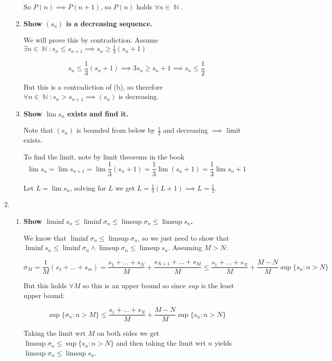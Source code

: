 \documentclass[10pt,a4paper]{article}
\DeclareMathOperator*{\N}{\mathbb{N}}
\begin{document}
\begin{enumerate}
\begin{enumerate}
            So $P(n) \implies P(n+1)$, so $P(n)$ holds $\forall n \in \N$.
        
        \item \textbf{Show $( s_n)$ is a decreasing sequence.}

            We will prove this by contradiction. Assume $\exists n \in \N: s_n \leq s_{n+1} \implies s_n \geq \frac{1}{3}(s_n + 1)$

            $$s_n \leq \frac{1}{3} (s_n + 1) \implies 3s_n \geq s_n+1 \implies s_n \leq \frac{1}{2}$$

            But this is a contradiction of (b), so therefore $\forall n \in \N : s_n > s_{n+1} \implies (s_n)$ is decreasing.

        \item \textbf{Show $\lim s_n$ exists and find it.}

            Note that $(s_n)$ is bounded from below by $\frac{1}{2}$ and decreasing $\implies$ limit exists.

            To find the limit, note by limit theorems in the book
            $$\lim s_n = \lim s_{n+1} = \lim \frac{1}{3}(s_n + 1) = \frac{1}{3} \lim (s_n +1)  = \frac{1}{3} \lim s_n +1 $$

            Let $L = \lim s_n$, solving for $L$ we get $L = \frac{1}{3}(L+1) \implies L = \frac{1}{2}$.


    \end{enumerate}
    
    \item \begin{enumerate}
        \item \textbf{Show $\liminf s_n \leq \liminf \sigma_n \leq \limsup \sigma_n \leq \limsup s_n$.}

        We know that $\liminf \sigma_n \leq \limsup \sigma_n$, so we just need to show that $\liminf s_n \leq \liminf \sigma_n \land \limsup \sigma_n \leq \limsup s_n$. Assuming $M > N$:

        $$\sigma_M = \frac{1}{M}(s_1 + \ldots + s_m) = \frac{s_1 + \ldots + s_N}{M} + \frac{s_{N+1} + \ldots + s_M}{M} \leq \frac{s_1 + \ldots + s_N}{M} + \frac{M-N}{M} \sup \{ s_n : n > N\}$$

        But this holds $\forall M$ so this is an upper bound so since $sup$ is the least upper bound:

        $$\sup \{ \sigma_n : n > M\} \leq \frac{s_1 + \ldots + s_N}{M} + \frac{M-N}{M} \sup \{ s_n : n > N\}$$

        Taking the limit wrt $M$ on both sides we get 
        $\limsup \sigma_n \leq \sup \{ s_n : n > N\}$ and then taking the limit wrt $n$  yields $ \limsup \sigma_n \leq \limsup s_n$.


\end{enumerate}
\end{enumerate}
\end{document}
